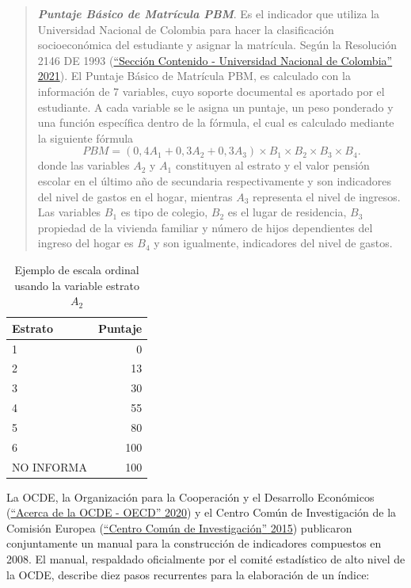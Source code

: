 \documentclass[
  11pt,
]{book}
\begin{document}
\begin{quote}
\textbf{\emph{Puntaje Básico de Matrícula PBM}}.
Es el indicador que utiliza la Universidad Nacional de Colombia para hacer la
clasificación socioeconómica del estudiante y asignar la matrícula. Según la Resolución 2146 DE 1993 (\protect\hyperlink{ref-BibEntry2021Maria}{{``{Secci{ó}n Contenido - Universidad Nacional de Colombia}''} 2021}). El Puntaje Básico de Matrícula PBM, es calculado con la información de 7 variables, cuyo
soporte documental es aportado por el estudiante. A cada variable se le asigna un puntaje, un peso ponderado y una función específica dentro de la fórmula, el cual es calculado mediante la siguiente fórmula
\[\begin{equation}
PBM=(0,4A_1+0,3A_2+0,3A_3)\times B_1 \times B_2 \times B_3 \times B_4.
\end{equation}\]
donde las variables \(A_2\) y \(A_1\) constituyen al estrato y el valor pensión escolar en el último año de secundaria respectivamente y son indicadores del nivel de gastos en el hogar, mientras \(A_3\) representa el nivel de ingresos. Las variables \(B_1\) es tipo de colegio, \(B_2\) es el lugar de residencia, \(B_3\) propiedad de la vivienda familiar y número de hijos dependientes del ingreso del hogar es \(B_4\) y son igualmente, indicadores del nivel de gastos.
\end{quote}

\begin{table}

\caption{\label{tab:estrato}Ejemplo de escala ordinal usando la variable estrato $A_2$}
\centering
\begin{tabular}[t]{l|r}
\hline
Estrato & Puntaje\\
\hline
1 & 0\\
\hline
2 & 13\\
\hline
3 & 30\\
\hline
4 & 55\\
\hline
5 & 80\\
\hline
6 & 100\\
\hline
NO INFORMA & 100\\
\hline
\end{tabular}
\end{table}

La OCDE, la Organización para la Cooperación y el Desarrollo Económicos (\protect\hyperlink{ref-BibEntry2020Dec}{{``{Acerca de la OCDE - OECD}''} 2020}) y el Centro Común de Investigación de la Comisión Europea (\protect\hyperlink{ref-BibEntry2015Jun}{{``{Centro Com{ú}n de Investigaci{ó}n}''} 2015}) publicaron conjuntamente un manual para la construcción de indicadores compuestos en 2008. El manual, respaldado oficialmente por el comité estadístico de alto nivel de la OCDE, describe diez pasos recurrentes para la elaboración de un índice:
\end{document}
